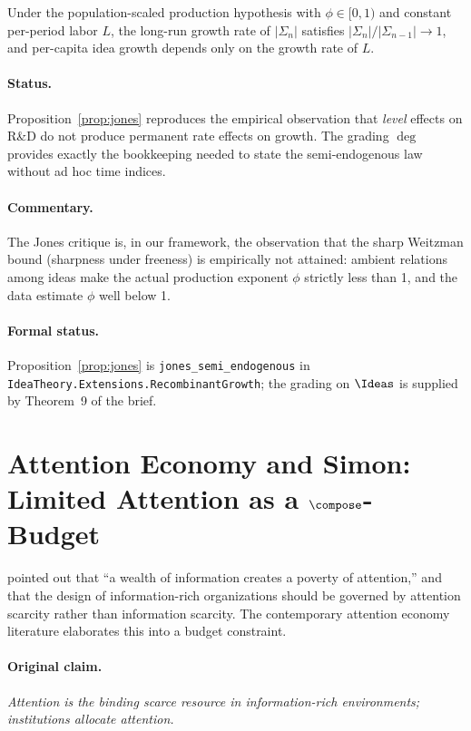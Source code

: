 \begin{proposition}
\label{prop:jones}
Under the population-scaled production hypothesis with $\phi\in[0,1)$
and constant per-period labor $L$, the long-run growth rate of
$|\Sigma_n|$ satisfies $|\Sigma_n|/|\Sigma_{n-1}| \to 1$, and per-capita
idea growth depends only on the growth rate of $L$.
\end{proposition}

\paragraph{Status.} Proposition~\ref{prop:jones} reproduces the
empirical observation that \emph{level} effects on R\&D do not produce
permanent rate effects on growth. The grading $\deg$ provides exactly
the bookkeeping needed to state the semi-endogenous law without ad hoc
time indices.

\paragraph{Commentary.} The Jones critique is, in our framework, the
observation that the sharp Weitzman bound (sharpness under freeness) is
empirically not attained: ambient relations among ideas make the actual
production exponent $\phi$ strictly less than 1, and the data
\citep{Jones1995} estimate $\phi$ well below 1.

\paragraph{Formal status.} Proposition~\ref{prop:jones} is
\texttt{jones\_semi\_endogenous} in
\texttt{IdeaTheory.Extensions.RecombinantGrowth}; the grading on
$\Ideas$ is supplied by Theorem~9 of the brief.

\section{Attention Economy and Simon: Limited Attention as a $\compose$-Budget}
\label{sec:simon}

\citet{Simon1971} pointed out that ``a wealth of information creates a
poverty of attention,'' and that the design of information-rich
organizations should be governed by attention scarcity rather than
information scarcity. The contemporary attention economy literature
elaborates this into a budget constraint.

\paragraph{Original claim.} \emph{Attention is the binding scarce
resource in information-rich environments; institutions allocate
attention.}


